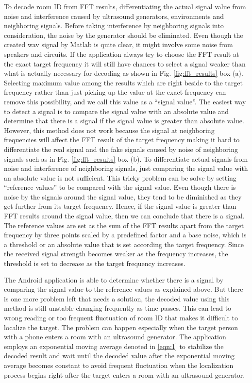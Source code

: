 To decode room ID from FFT results, differentiating the actual signal value from noise and interference caused by ultrasound generators, environments and neighboring signals. Before taking interference by neighboring signals into consideration, the noise by the generator should be eliminated. Even though the created wav signal by Matlab is quite clear, it might involve some noise from speakers and circuits. If the application always try to choose the FFT result at the exact target frequency it will still have chances to select a signal weaker than what is actually necessary for decoding as shown in Fig. \ref{fig:fft_results} box (a). Selecting maximum value among the results which are right beside to the target frequency rather than just picking up the value at the exact frequency can remove this possibility, and we call this value as a “signal value”. The easiest way to detect a signal is to compare the signal value with an absolute value and determine that there is a signal if the signal value is greater than absolute value. However, this method does not work because the signal at neighboring frequencies will affect the FFT result of the target frequency making it hard to differentiate the real signal and the fake signals caused by noise of neighboring signals such as in Fig. \ref{fig:fft_results} box (b). To differentiate actual signals from noise and interference of neighboring signals, just comparing the signal value with an absolute value is not sufficient. This tricky problem can be solve by setting “reference values” to be compared with the signal value. Even though there is noise by the signals around
the signal value, they tend to be diminished as they get further
from its target frequency. Hence, if the signal value is greater
than FFT results around the signal value, then we can conclude
that there is a signal. The reference values are set as the sum
of the FFT results apart from the target frequency by three
points scaled by a predefined factor and a base noise, which is
a threshold or an absolute value that is set according the target
frequency. Since the received signal strength becomes weaker
as the frequency increases, the threshold is set to decrease as
the target frequency increases.

The Android application is able to determine whether there is a signal by comparing the signal value to the reference values as explained above. But there is one more problem left that needs a solution, the decoded value using this method is still unstable changing frequently as time passes. This can lead to wrong reading or too frequent fluctuation of room ID that makes it difficult to localize the target.  The problem can happen especially when the target person with a phone enters a room with an ultrasound generator. The application employs an exponential moving average denoted in \ref{eqn:1} to stabilize the decoded result and wait until the decoded value after the exponential moving average becomes constant to avoid frequent fluctuation when the localization process begins right after the target enters a room with an ultrasound generator.

